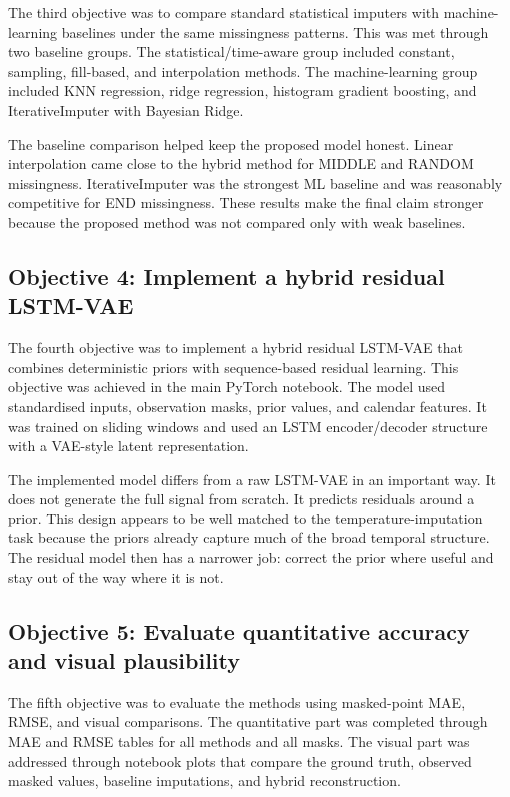 The third objective was to compare standard statistical imputers with machine-learning baselines under the same missingness patterns. This was met through two baseline groups. The statistical/time-aware group included constant, sampling, fill-based, and interpolation methods. The machine-learning group included KNN regression, ridge regression, histogram gradient boosting, and IterativeImputer with Bayesian Ridge.

The baseline comparison helped keep the proposed model honest. Linear interpolation came close to the hybrid method for MIDDLE and RANDOM missingness. IterativeImputer was the strongest ML baseline and was reasonably competitive for END missingness. These results make the final claim stronger because the proposed method was not compared only with weak baselines.

\subsection{Objective 4: Implement a hybrid residual LSTM-VAE}

The fourth objective was to implement a hybrid residual LSTM-VAE that combines deterministic priors with sequence-based residual learning. This objective was achieved in the main PyTorch notebook. The model used standardised inputs, observation masks, prior values, and calendar features. It was trained on sliding windows and used an LSTM encoder/decoder structure with a VAE-style latent representation.

The implemented model differs from a raw LSTM-VAE in an important way. It does not generate the full signal from scratch. It predicts residuals around a prior. This design appears to be well matched to the temperature-imputation task because the priors already capture much of the broad temporal structure. The residual model then has a narrower job: correct the prior where useful and stay out of the way where it is not.

\subsection{Objective 5: Evaluate quantitative accuracy and visual plausibility}

The fifth objective was to evaluate the methods using masked-point MAE, RMSE, and visual comparisons. The quantitative part was completed through MAE and RMSE tables for all methods and all masks. The visual part was addressed through notebook plots that compare the ground truth, observed masked values, baseline imputations, and hybrid reconstruction.

